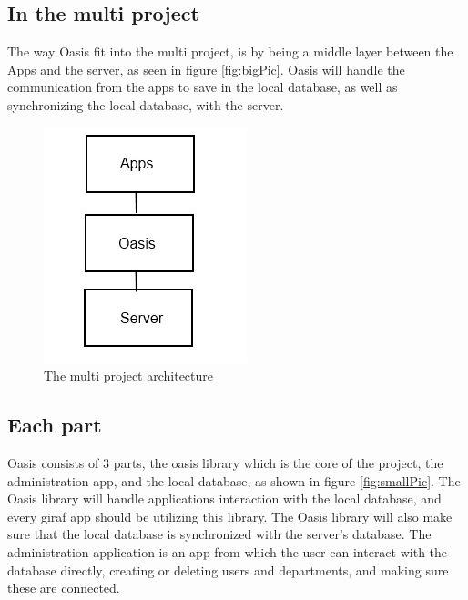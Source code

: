 \subsection{In the multi project}
The way Oasis fit into the multi project, is by being a middle layer between the Apps and the server, as seen in figure \vref{fig:bigPic}. Oasis will handle the communication from the apps to save in the local database, as well as synchronizing the local database, with the server.

\begin{figure}
	\centering
		\includegraphics[width=\textwidth]{images/BigPicture.jpg}
	\caption{The multi project architecture}
	\label{fig:bigpic}
\end{figure}

\subsection{Each part}
Oasis consists of 3 parts, the oasis library which is the core of the project, the administration app, and the local database, as shown in figure \vref{fig:smallPic}. The Oasis library will handle applications interaction with the local database, and every giraf app should be utilizing this library. The Oasis library will also make sure that the local database is synchronized with the server's database.
The administration application is an app from which the user can interact with the database directly, creating or deleting users and departments, and making sure these are connected.

